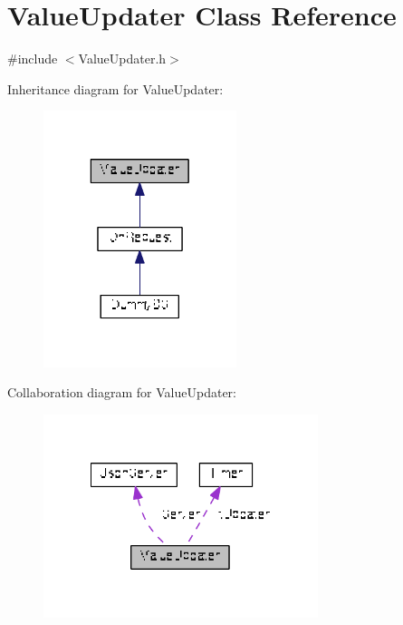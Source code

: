 \hypertarget{class_value_updater}{\section{Value\+Updater Class Reference}
\label{class_value_updater}
}


{\ttfamily \#include $<$Value\+Updater.\+h$>$}



Inheritance diagram for Value\+Updater\+:
\nopagebreak
\begin{figure}[H]
\begin{center}
\leavevmode
\includegraphics[width=160pt]{class_value_updater__inherit__graph}
\end{center}
\end{figure}


Collaboration diagram for Value\+Updater\+:
\nopagebreak
\begin{figure}[H]
\begin{center}
\leavevmode
\includegraphics[width=227pt]{class_value_updater__coll__graph}
\end{center}
\end{figure}
